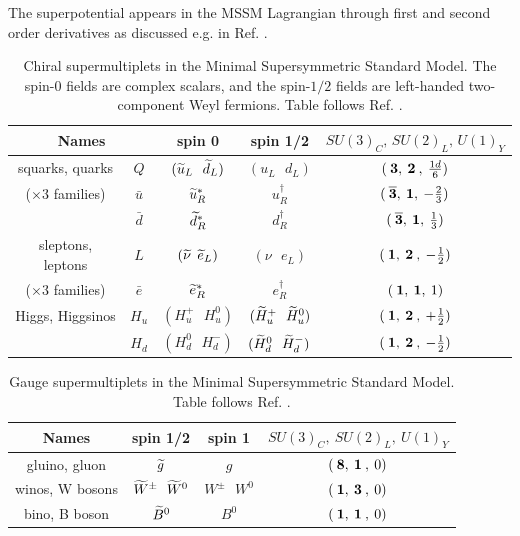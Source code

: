 The superpotential appears in the MSSM Lagrangian through first and second order derivatives as discussed e.g. in Ref. \cite{Martin:1997ns}.

\begin{table}[h]
\begin{center}
\begin{tabular}{c c c c c}
\hline
\multicolumn{2}{c}{Names} 
& spin 0 & spin 1/2 & $SU(3)_C ,\, SU(2)_L ,\, U(1)_Y$
\\  \hline\hline
squarks, quarks & $Q$ & $({\widetilde{u}}_L\>\>\>{\widetilde{d}}_L )$&
 $(u_L\>\>\>d_L)$ & $(\>{\bf 3},\>{\bf 2}\>,\>{1d\over 6})$
\\
($\times 3$ families) & $\bar{u}$
&${\widetilde{u}}^*_R$ & $u^\dagger_R$ & 
$(\>{\bf \overline 3},\> {\bf 1},\> -{2\over 3})$
\\ & $\bar{d}$ &${\widetilde{d}}^*_R$ & $d^\dagger_R$ & 
$(\>{\bf \overline 3},\> {\bf 1},\> {1\over 3})$
\\  \hline
sleptons, leptons & $L$ &$({\widetilde{\nu}}\>\>{\widetilde{e}}_L )$&
 $(\nu\>\>\>e_L)$ & $(\>{\bf 1},\>{\bf 2}\>,\>-{1\over 2})$
\\
($\times 3$ families) & $\bar{e}$
&${\widetilde{e}}^*_R$ & $e^\dagger_R$ & $(\>{\bf 1},\> {\bf 1},\>1)$
\\  \hline
Higgs, Higgsinos &$H_u$ &$(H_u^+\>\>\>H_u^0 )$&
$(\widetilde{H}_u^+ \>\>\> \widetilde{H}_u^0)$& 
$(\>{\bf 1},\>{\bf 2}\>,\>+{1\over 2})$
\\ &$H_d$ & $(H_d^0 \>\>\> H_d^-)$ & $(\widetilde{H}_d^0 \>\>\> \widetilde{H}_d^-)$& 
$(\>{\bf 1},\>{\bf 2}\>,\>-{1\over 2})$
\\  \hline
\end{tabular}
\caption{Chiral supermultiplets in the Minimal Supersymmetric Standard Model.
The spin-$0$ fields are complex scalars, and the spin-$1/2$ fields are 
left-handed two-component Weyl fermions. Table follows Ref. \cite{Martin:1997ns}. \label{tab:chiral}}
\vspace{-0.6cm}
\end{center}
\end{table}



\begin{table}[h]
\begin{center}
\begin{tabular}{c c c c}
\hline
Names & spin 1/2 & spin 1 & $SU(3)_C, \> SU(2)_L,\> U(1)_Y$\\
\hline\hline
gluino, gluon &$ \widetilde{g}$& $g$ & $(\>{\bf 8},\>{\bf 1}\>,\> 0)$
\\
\hline
winos, W bosons & $ \widetilde {W}^\pm\>\>\> \widetilde {W}^0 $&
 $W^\pm\>\>\> W^0$ & $(\>{\bf 1},\>{\bf 3}\>,\> 0)$
\\
\hline
bino, B boson &$\widetilde{B}^0$&
 $B^0$ & $(\>{\bf 1},\>{\bf 1}\>,\> 0)$
\\
\hline
\end{tabular}
\caption{Gauge supermultiplets in
the Minimal Supersymmetric Standard Model. Table follows Ref. \cite{Martin:1997ns}. \label{tab:gauge}}
\vspace{-0.45cm}
\end{center}
\end{table}

